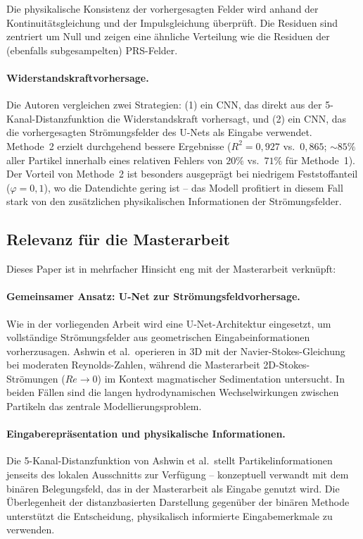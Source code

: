 \documentclass[a4paper,12pt]{article}
\begin{document}
Die physikalische Konsistenz der vorhergesagten Felder wird anhand der
Kontinuitätsgleichung und der Impulsgleichung überprüft. Die Residuen sind
zentriert um Null und zeigen eine ähnliche Verteilung wie die Residuen der
(ebenfalls subgesampelten) PRS-Felder.

\paragraph{Widerstandskraftvorhersage.}
Die Autoren vergleichen zwei Strategien: (1) ein CNN, das direkt aus der
5-Kanal-Distanzfunktion die Widerstandskraft vorhersagt, und (2) ein CNN, das
die vorhergesagten Strömungsfelder des U-Nets als Eingabe verwendet. Methode~2
erzielt durchgehend bessere Ergebnisse ($R^2 = 0{,}927$ vs.\
$0{,}865$; $\sim\!85\%$ aller Partikel innerhalb eines relativen Fehlers von
$20\%$ vs.\ $71\%$ für Methode~1). Der Vorteil von Methode~2 ist besonders
ausgeprägt bei niedrigem Feststoffanteil ($\varphi = 0{,}1$), wo die
Datendichte gering ist -- das Modell profitiert in diesem Fall stark von den
zusätzlichen physikalischen Informationen der Strömungsfelder.

\subsection*{Relevanz für die Masterarbeit}

Dieses Paper ist in mehrfacher Hinsicht eng mit der Masterarbeit verknüpft:

\paragraph{Gemeinsamer Ansatz: U-Net zur Strömungsfeldvorhersage.}
Wie in der vorliegenden Arbeit wird eine U-Net-Architektur eingesetzt, um
vollständige Strömungsfelder aus geometrischen Eingabeinformationen
vorherzusagen. Ashwin et al.\ operieren in 3D mit der Navier-Stokes-Gleichung
bei moderaten Reynolds-Zahlen, während die Masterarbeit 2D-Stokes-Strömungen
($Re \to 0$) im Kontext magmatischer Sedimentation untersucht. In beiden Fällen
sind die langen hydrodynamischen Wechselwirkungen zwischen Partikeln das
zentrale Modellierungsproblem.

\paragraph{Eingaberepräsentation und physikalische Informationen.}
Die 5-Kanal-Distanzfunktion von Ashwin et al.\ stellt Partikelinformationen
jenseits des lokalen Ausschnitts zur Verfügung -- konzeptuell verwandt mit dem
binären Belegungsfeld, das in der Masterarbeit als Eingabe genutzt wird. Die
Überlegenheit der distanzbasierten Darstellung gegenüber der binären Methode
unterstützt die Entscheidung, physikalisch informierte Eingabemerkmale zu
verwenden.
\end{document}
